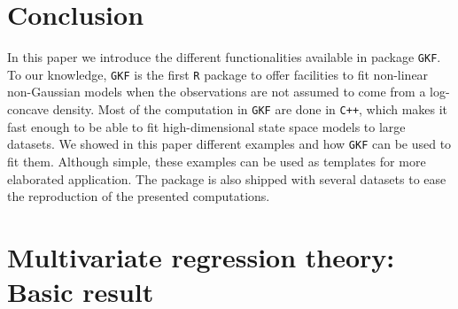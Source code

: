 \documentclass{article}
\newcommand{\R}{\texttt{R}\xspace}
\newcommand{\GKF}{\texttt{GKF}\xspace}
\begin{document}
\section{Conclusion}
\label{sec:CL}

In this paper we introduce the different functionalities available in package \GKF. To our
knowledge, \GKF is the first \R package to offer facilities to fit non-linear non-Gaussian
models when the observations are not assumed to come from a log-concave density. Most of the
computation in \GKF are done in \texttt{C++}, which makes it fast enough to be able to fit
high-dimensional state space models to large datasets. We showed in this paper different
examples and how \GKF can be used to fit them. Although simple, these examples can be used as
templates for more elaborated application. The package is also shipped with several
datasets to ease the reproduction of the presented computations.




\appendix

\section{Multivariate regression theory: Basic result}
\label{sec:MultiVNormal}
\end{document}
